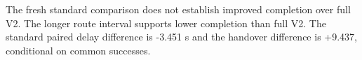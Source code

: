 The fresh standard comparison does not establish improved completion over full V2. The longer route interval supports lower completion than full V2. The standard paired delay difference is -3.451 s and the handover difference is +9.437, conditional on common successes.
